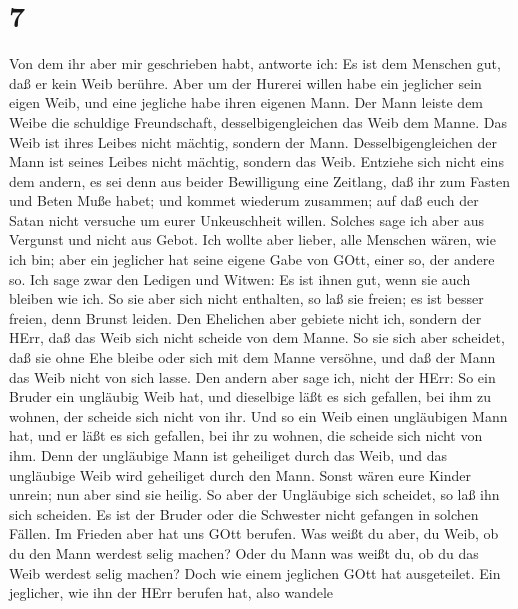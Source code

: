 \hypertarget{section-6}{%
\section{7}\label{section-6}}

 Von dem ihr aber mir geschrieben habt, antworte ich: Es ist
dem Menschen gut, daß er kein Weib berühre.  Aber um der
Hurerei willen habe ein jeglicher sein eigen Weib, und eine jegliche
habe ihren eigenen Mann.  Der Mann leiste dem Weibe die
schuldige Freundschaft, desselbigengleichen das Weib dem Manne.
 Das Weib ist ihres Leibes nicht mächtig, sondern der Mann.
Desselbigengleichen der Mann ist seines Leibes nicht mächtig, sondern
das Weib.  Entziehe sich nicht eins dem andern, es sei denn
aus beider Bewilligung eine Zeitlang, daß ihr zum Fasten und Beten Muße
habet; und kommet wiederum zusammen; auf daß euch der Satan nicht
versuche um eurer Unkeuschheit willen.  Solches sage ich
aber aus Vergunst und nicht aus Gebot.  Ich wollte aber
lieber, alle Menschen wären, wie ich bin; aber ein jeglicher hat seine
eigene Gabe von GOtt, einer so, der andere so.  Ich sage
zwar den Ledigen und Witwen: Es ist ihnen gut, wenn sie auch bleiben wie
ich.  So sie aber sich nicht enthalten, so laß sie freien;
es ist besser freien, denn Brunst leiden.  Den Ehelichen
aber gebiete nicht ich, sondern der HErr, daß das Weib sich nicht
scheide von dem Manne.  So sie sich aber scheidet, daß sie
ohne Ehe bleibe oder sich mit dem Manne versöhne, und daß der Mann das
Weib nicht von sich lasse.  Den andern aber sage ich, nicht
der HErr: So ein Bruder ein ungläubig Weib hat, und dieselbige läßt es
sich gefallen, bei ihm zu wohnen, der scheide sich nicht von ihr.
 Und so ein Weib einen ungläubigen Mann hat, und er läßt es
sich gefallen, bei ihr zu wohnen, die scheide sich nicht von ihm.
 Denn der ungläubige Mann ist geheiliget durch das Weib,
und das ungläubige Weib wird geheiliget durch den Mann. Sonst wären eure
Kinder unrein; nun aber sind sie heilig.  So aber der
Ungläubige sich scheidet, so laß ihn sich scheiden. Es ist der Bruder
oder die Schwester nicht gefangen in solchen Fällen. Im Frieden aber hat
uns GOtt berufen.  Was weißt du aber, du Weib, ob du den
Mann werdest selig machen? Oder du Mann was weißt du, ob du das Weib
werdest selig machen?  Doch wie einem jeglichen GOtt hat
ausgeteilet. Ein jeglicher, wie ihn der HErr berufen hat, also wandele
